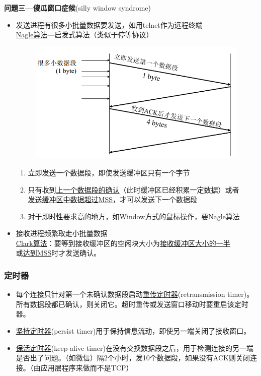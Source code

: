 \myhline
\textbf{问题三---傻瓜窗口症候}(silly window syndrome)
\begin{itemize}
    \item 发送进程有很多小批量数据要发送，如用telnet作为远程终端\\
    \underline{Nagle算法}---启发式算法（类似于停等协议）
    \begin{figure}[H]
        \centering
        \includegraphics[width=0.6\linewidth]{fig/nagle.PNG}
    \end{figure}
    \begin{enumerate}
        \item 立即发送一个数据段，即使发送缓冲区只有一个字节
        \item 只有收到\underline{上一个数据段的确认}（此时缓冲区已经积累一定数据）或者\\\underline{发送缓冲区中数据超过MSS}，才可以发送下一个数据段
        \item 对于即时性要求高的地方，如Window方式的鼠标操作，要Nagle算法
    \end{enumerate}
    \item 接收进程频繁取走小批量数据\\
    \underline{Clark算法}：要等到接收缓冲区的空闲块大小为\underline{接收缓冲区大小的一半}\\或\underline{达到MSS}时才发送确认。
\end{itemize}

\subsubsection{定时器}
\begin{itemize}
\item 每个连接只针对第一个未确认数据段启动\underline{重传定时器}(retransmission timer)。所有数据段都已确认，则关闭它。超时重传或发送窗口移动时要重启该定时器。
\item \underline{坚持定时器}(persist timer)用于保持信息流动，即使另一端关闭了接收窗口。
\item \underline{保活定时器}(keep-alive timer)在没有交换数据段之后，用于检测连接的另一端是否出了问题。（如微信）隔2个小时，发10个数据段，如果没有ACK则关闭连接。（由应用层程序来做而不是TCP）
\end{itemize}

